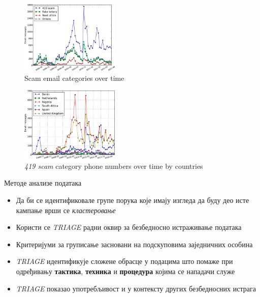 \documentclass[compress, containsverbatim,mathserif, xcolor=dvipsnames, unicode]{beamer}
\begin{document}
\begin{frame}
\begin{figure}[h!]
    \centering
    \begin{center}
    \includegraphics[width=47mm]{slike/1.jpg}
    \caption{Scam email categories over time}
    \end{center}
\end{figure}

\begin{figure}[h!]
    \centering
    \begin{center}
    \includegraphics[width=47mm]{slike/2.jpg}
    \caption{\emph{419 scam} category phone numbers over time by countries}
    \end{center}
\end{figure}

\end{frame}

\begin{frame}{Методе анализе података}
\begin{itemize}
	\item Да би се идентификовале групе порука које имају изгледа да буду део исте кампање врши се \emph{кластеровање}
	\item Користи се \emph{TRIAGE} радни оквир за безбедносно истраживање података
	\item Критеријуми за груписање засновани на подскуповима заједничних особина
	\item \emph{TRIAGE} идентификује сложене обрасце у подацима што помаже при одређивању \textbf{тактика}, \textbf{техника} и \textbf{процедура} којима се нападачи служе
	\item \emph{TRIAGE} показао употребљивост и у контексту других безбедносних истрага	
\end{itemize}
\end{frame}
\end{document}
